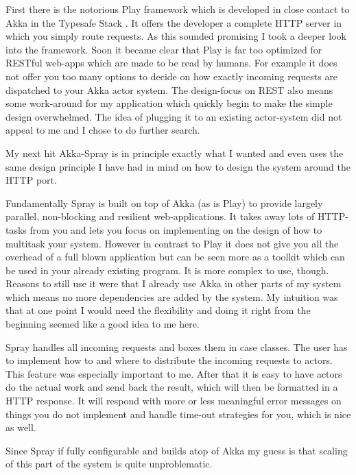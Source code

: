 \documentclass[twoside, 11pt]{scrartcl}
\begin{document}
First there is the notorious Play framework which is developed in close contact to Akka in the Typesafe Stack \cite{link:play}. 
It offers the developer a complete HTTP server in which you simply route requests. As this sounded promising I took a deeper look into the framework. Soon it became clear that Play is far too optimized for RESTful web-apps which are made to be read by humans. For example it does not offer you too many options to decide on how exactly incoming requests are dispatched to your Akka actor system. The design-focus on REST also means some work-around for my application which quickly begin to make the simple design overwhelmed. The idea of plugging it to an existing actor-system did not appeal to me and I chose to do further search.

My next hit Akka-Spray is in principle exactly what I wanted and even uses the same design principle I have had in mind on how to design the system around the HTTP port.

Fundamentally Spray is built on top of Akka (as is Play) to provide largely parallel, non-blocking and resilient web-applications. It takes away lots of HTTP-tasks from you and lets you focus on implementing on the design of how to multitask your system. However in contrast to Play it does not give you all the overhead of a full blown application but can be seen more as a toolkit which can be used in your already existing program.
It is more complex to use, though. Reasons to still use it were that I already use Akka in other parts of my system which means no more dependencies are added by the system. My intuition was that at one point I would need the flexibility and doing it right from the beginning seemed like a good idea to me here.

Spray handles all incoming requests and boxes them in case classes. The user has to implement how to and where to distribute the incoming requests to actors. This feature was especially important to me. After that it is easy to have actors do the actual work and send back the result, which will then be formatted in a HTTP response.  It will respond with more or less meaningful error messages on things you do not implement and handle time-out strategies for you, which is nice as well.

Since Spray if fully configurable and builds atop of Akka my guess is that scaling of this part of the system is quite unproblematic. 
\end{document}
